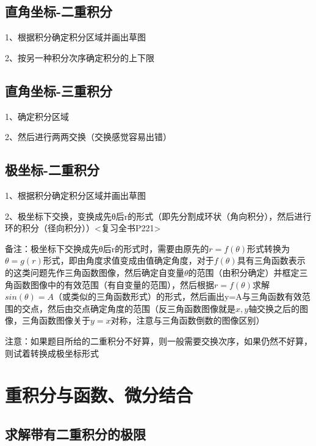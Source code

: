 \subsection{直角坐标-二重积分}

1、根据积分确定积分区域并画出草图

2、按另一种积分次序确定积分的上下限



\subsection{直角坐标-三重积分}

1、确定积分区域

2、然后进行两两交换（交换感觉容易出错）



\subsection{极坐标-二重积分}

1、根据积分确定积分区域并画出草图

2、极坐标下交换，变换成先θ后r的形式（即先分割成环状（角向积分），然后进行环的积分（径向积分））<复习全书P221>

备注：极坐标下交换成先θ后r的形式时，需要由原先的$r=f(\theta)$形式转换为$\theta=g(r)$形式，即由角度求值变成由值确定角度，对于$f(\theta)$具有三角函数表示的这类问题先作三角函数图像，然后确定自变量$\theta$的范围（由积分确定）并框定三角函数图像中的有效范围（有自变量的范围），然后根据$r=f(\theta)$求解$sin(\theta)=A$（或类似的三角函数形式）的形式，然后画出y=A与三角函数有效范围的交点，然后由交点确定角度的范围（反三角函数图像就是$x,y$轴交换之后的图像，三角函数图像关于$y=x$对称，注意与三角函数倒数的图像区别）

注意：如果题目所给的二重积分不好算，则一般需要交换次序，如果仍然不好算，则试着转换成极坐标形式

\section{重积分与函数、微分结合}



\subsection{求解带有二重积分的极限}


